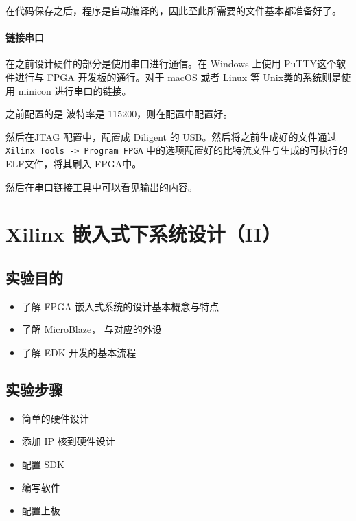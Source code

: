 \documentclass{ctexart}
\begin{document}
        在代码保存之后，程序是自动编译的，因此至此所需要的文件基本都准备好了。
        
        \paragraph{链接串口}
        
        在之前设计硬件的部分是使用串口进行通信。在 Windows 上使用
        PuTTY这个软件进行与 FPGA 开发板的通行。对于 macOS 或者 Linux
        等 Unix类的系统则是使用 minicon 进行串口的链接。
        
        之前配置的是 波特率是 115200，则在配置中配置好。
        
        然后在JTAG 配置中，配置成 Diligent 的 USB。然后将之前生成好的文件通过
        \verb|Xilinx Tools -> Program FPGA|  中的选项配置好的比特流文件与生成的可执行的ELF文件，将其刷入 FPGA中。

        然后在串口链接工具中可以看见输出的内容。



        \section{Xilinx 嵌入式下系统设计（II）}
        
        \subsection{实验目的}
        \begin{itemize}
            \item 了解 FPGA 嵌入式系统的设计基本概念与特点
            \item 了解 MicroBlaze， 与对应的外设
            \item 了解 EDK 开发的基本流程
        \end{itemize}
        
        \subsection{实验步骤}
        
        \begin{itemize}
            \item 简单的硬件设计
            \item 添加 IP 核到硬件设计
            \item 配置 SDK
            \item 编写软件
            \item 配置上板
        \end{itemize}
\end{document}
